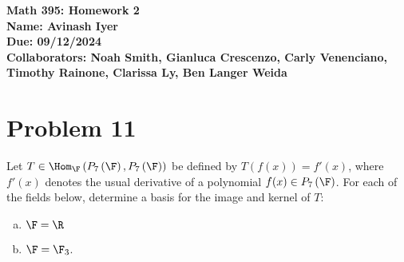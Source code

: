 \documentclass[12pt]{mypackage}
\begin{document}
\RaggedRight
\begin{center}
  \bfseries
  Math 395: Homework 2\\
  Name: Avinash Iyer\\
  Due: 09/12/2024\\
  Collaborators: Noah Smith, Gianluca Crescenzo, Carly Venenciano, Timothy Rainone, Clarissa Ly, Ben Langer Weida
\end{center}
\section{Problem 11}%
\begin{problem}
  Let $T\in \Hom_{\F}\left(P_7\left(\F\right),P_{7}\left(\F\right)\right)$ be defined by $T\left(f(x)\right) = f'(x)$, where $f'(x)$ denotes the usual derivative of a polynomial $f(x)\in P_{7}\left(\F\right)$. For each of the fields below, determine a basis for the image and kernel of $T$:
  \begin{enumerate}[(a)]
    \item $\F = \R$
    \item $\F = \F_{3}$.
  \end{enumerate}
\end{problem}
\end{document}
